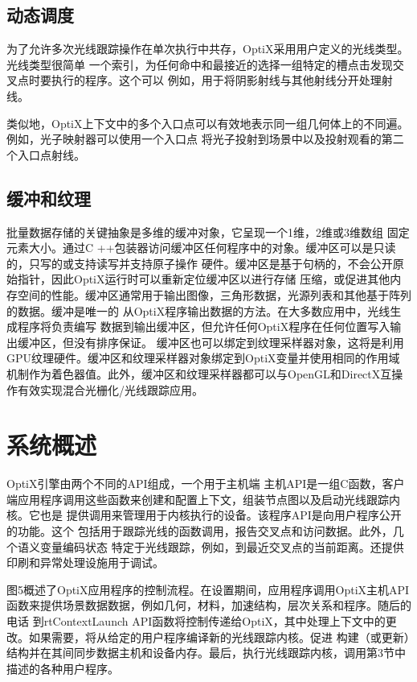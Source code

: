 \subsection{动态调度}

为了允许多次光线跟踪操作在单次执行中共存，OptiX采用用户定义的光线类型。光线类型很简单
一个索引，为任何命中和最接近的选择一组特定的槽点击发现交叉点时要执行的程序。这个可以
例如，用于将阴影射线与其他射线分开处理射线。

类似地，OptiX上下文中的多个入口点可以有效地表示同一组几何体上的不同遍。例如，光子映射器可以使用一个入口点
将光子投射到场景中以及投射观看的第二个入口点射线。

\subsection{缓冲和纹理}

批量数据存储的关键抽象是多维的缓冲对象，它呈现一个1维，2维或3维数组
固定元素大小。通过C ++包装器访问缓冲区任何程序中的对象。缓冲区可以是只读的，只写的或支持读写并支持原子操作
硬件。缓冲区是基于句柄的，不会公开原始指针，因此OptiX运行时可以重新定位缓冲区以进行存储
压缩，或促进其他内存空间的性能。缓冲区通常用于输出图像，三角形数据，光源列表和其他基于阵列的数据。缓冲是唯一的
从OptiX程序输出数据的方法。在大多数应用中，光线生成程序将负责编写
数据到输出缓冲区，但允许任何OptiX程序在任何位置写入输出缓冲区，但没有排序保证。
缓冲区也可以绑定到纹理采样器对象，这将是利用GPU纹理硬件。缓冲区和纹理采样器对象绑定到OptiX变量并使用相同的作用域
机制作为着色器值。此外，缓冲区和纹理采样器都可以与OpenGL和DirectX互操作有效实现混合光栅化/光线跟踪应用。

\section{系统概述}

OptiX引擎由两个不同的API组成，一个用于主机端
主机API是一组C函数，客户端应用程序调用这些函数来创建和配置上下文，组装节点图以及启动光线跟踪内核。它也是
提供调用来管理用于内核执行的设备。该程序API是向用户程序公开的功能。这个
包括用于跟踪光线的函数调用，报告交叉点和访问数据。此外，几个语义变量编码状态
特定于光线跟踪，例如，到最近交叉点的当前距离。还提供印刷和异常处理设施用于调试。

图5概述了OptiX应用程序的控制流程。在设置期间，应用程序调用OptiX主机API函数来提供场景数据数据，例如几何，材料，加速结构，层次关系和程序。随后的电话
到rtContextLaunch API函数将控制传递给OptiX，其中处理上下文中的更改。如果需要，将从给定的用户程序编译新的光线跟踪内核。促进
构建（或更新）结构并在其间同步数据主机和设备内存。最后，执行光线跟踪内核，调用第3节中描述的各种用户程序。

